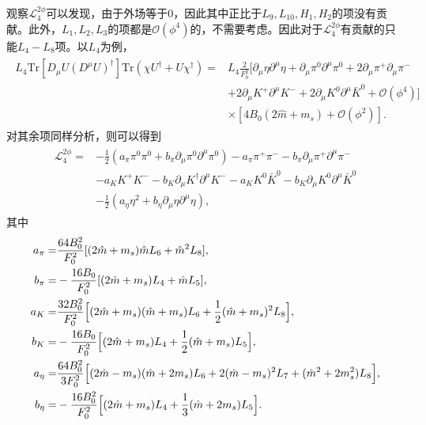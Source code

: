 \documentclass[aps,tightenlines,16pt]{ctexart}
\numberwithin{equation}{section}
\newcommand{\mL}{\mathcal{L}}
\newcommand{\Tr}{\text{Tr}}
\begin{document}
观察$\mL_4^{2\phi}$可以发现，由于外场等于0，因此其中正比于$L_9,L_{10},H_1,H_2$的项没有贡献。此外，$L_1,L_2,L_3$的项都是$\mathcal{O}(\phi^4)$的，不需要考虑。因此对于$\mL_4^{2\phi}$有贡献的只能$L_4-L_8$项。以$L_4$为例，
\begin{align}
   \begin{aligned}
      L_4\Tr[D_{\mu}U(D^{\mu}U)^{\dagger}]\Tr(\chi U^{\dagger}+U\chi^{\dagger}) =& L_4\frac{2}{F_0^2}[\partial_{\mu}\eta \partial^{\mu}\eta + \partial_{\mu}\pi^0 \partial^{\mu}\pi^0+2\partial_{\mu}\pi^+\partial_{\mu}\pi^-
      \\
      &+2\partial_{\mu}K^+\partial^{\mu}K^-+2\partial_{\mu}K^0\partial^{\mu}\bar{K}^0+\mathcal{O}(\phi^4)]\\
      &\times [4B_0(2\hat{m}+m_s)+\mathcal{O}(\phi^2)].
   \end{aligned}
\end{align}
对其余项同样分析，则可以得到
\begin{align}
   \begin{aligned}
   \mL_4^{2\phi} =&-\frac{1}{2}(a_{\pi}\pi^0\pi^0+b_{\pi}\partial_{\mu}\pi^0\partial^{\mu}\pi^0) -a_{\pi} \pi^{+}\pi^{-} -b_{\pi}\partial_{\mu}\pi^{+}\partial^{\mu}\pi^{-}\\
   &-a_K K^+K^--b_K\partial_{\mu}K^{\dagger}\partial^{\mu}K^- -a_K K^0 \bar{K}^0 -b_K \partial_{\mu}K^0\partial^{\mu}\bar{K}^0\\
   &-\frac{1}{2}(a_{\eta}\eta^2+b_{\eta}\partial_{\mu}\eta\partial^{\mu}\eta),
   \end{aligned}
\end{align}
其中
\begin{align}
   \begin{aligned}
      a_{\pi} =& \frac{64B_0^2}{F_0^2}[(2\hat{m}+m_s)\hat{m}L_6 + \hat{m}^2 L_8],\\
      b_{\pi} =& -\frac{16B_0}{F_0^2}[(2\hat{m}+m_s)L_4+\hat{m}L_5],\\
      a_{K} =& \frac{32B_0^2}{F_0^2}\Bigl[(2\hat{m}+m_s)(\hat{m}+m_s)L_6+\frac{1}{2}(\hat{m}+m_s)^2L_8\Bigr],\\
      b_{K} =& -\frac{16B_0}{F_0^2}\Bigl[(2\hat{m}+m_s)L_4+\frac{1}{2}(\hat{m}+m_s)L_5\Bigr],\\
      a_{\eta} =& \frac{64B_0^2}{3F_0^2}\Bigl[(2\hat{m}-m_s)(\hat{m}+2m_s)L_6+2(\hat{m}-m_s)^2L_7+(\hat{m}^2+2m_s^2)L_8\Bigr],\\
      b_{\eta} =& -\frac{16B_0^2}{F_0^2}\Bigl[(2\hat{m}+m_s)L_4+\frac{1}{3}(\hat{m}+2m_s)L_5\Bigr].
   \end{aligned}
\end{align}
\end{document}
